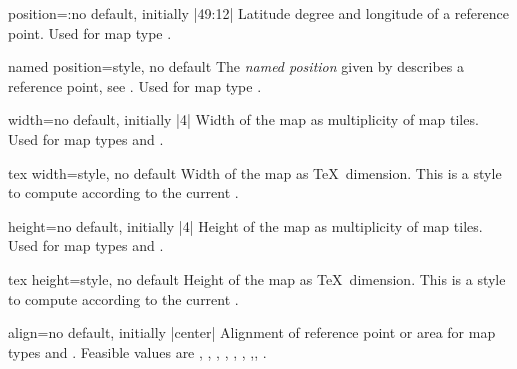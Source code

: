 \begin{docMrcKey}[supply]{position}{=:}{no default, initially |49:12|}
  Latitude degree and longitude of a reference point.
  Used for map type .
\end{docMrcKey}


\begin{docMrcKey}[supply]{named position}{=}{style, no default}
  The \emph{named position} given by  describes
  a reference point, see .
  Used for map type .
\end{docMrcKey}



\begin{docMrcKey}[supply]{width}{=}{no default, initially |4|}
  Width of the map as multiplicity of map tiles.
  Used for map types  and .
\end{docMrcKey}

\begin{docMrcKey}[supply]{tex width}{=}{style, no default}
  Width of the map as \TeX\ dimension.
  This is a style to compute  according to
  the current .
\end{docMrcKey}

\begin{docMrcKey}[supply]{height}{=}{no default, initially |4|}
  Height of the map as multiplicity of map tiles.
  Used for map types  and .
\end{docMrcKey}

\begin{docMrcKey}[supply]{tex height}{=}{style, no default}
  Height of the map as \TeX\ dimension.
  This is a style to compute  according to
  the current .
\end{docMrcKey}

\begin{docMrcKey}[supply]{align}{=}{no default, initially |center|}
  Alignment of reference point or area for map types  and .
  Feasible values are
  , , , ,
  , , ,, .
\end{docMrcKey}

